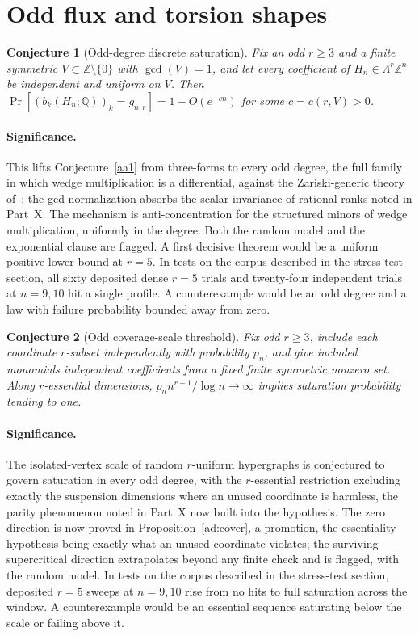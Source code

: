 \documentclass[11pt]{article}
\newtheorem{conjecture}{Conjecture}
\theoremstyle{definition}
\newcommand{\Z}{\mathbb Z}
\providecommand{\Z}{\mathbb Z}
\begin{document}
\section{Odd flux and torsion shapes}

\begin{conjecture}[Odd-degree discrete saturation]\label{ad1}
Fix an odd $r\ge3$ and a finite symmetric $V\subset\Z\setminus\{0\}$ with $\gcd(V)=1$, and let every coefficient of $H_n\in\Lambda^r\Z^n$ be independent and uniform on $V$.  Then $\Pr[(b_k(H_n;\mathbb Q))_k=g_{n,r}]=1-O(e^{-cn})$ for some $c=c(r,V)>0$.
\end{conjecture}

\paragraph{Significance.}
This lifts Conjecture~\ref{aa1} from three-forms to every odd degree, the full family in which wedge multiplication is a differential, against the Zariski-generic theory of~\cite{LN19}; the gcd normalization absorbs the scalar-invariance of rational ranks noted in Part~X.  The mechanism is anti-concentration for the structured minors of wedge multiplication, uniformly in the degree.  Both the random model and the exponential clause are flagged.  A first decisive theorem would be a uniform positive lower bound at $r=5$.  In tests on the corpus described in the stress-test section, all sixty deposited dense $r=5$ trials and twenty-four independent trials at $n=9,10$ hit a single profile.  A counterexample would be an odd degree and a law with failure probability bounded away from zero.

\begin{conjecture}[Odd coverage-scale threshold]\label{ad2}
Fix odd $r\ge3$, include each coordinate $r$-subset independently with probability $p_n$, and give included monomials independent coefficients from a fixed finite symmetric nonzero set.  Along $r$-essential dimensions, $p_nn^{r-1}/\log n\to\infty$ implies saturation probability tending to one.
\end{conjecture}

\paragraph{Significance.}
The isolated-vertex scale of random $r$-uniform hypergraphs is conjectured to govern saturation in every odd degree, with the $r$-essential restriction excluding exactly the suspension dimensions where an unused coordinate is harmless, the parity phenomenon noted in Part~X now built into the hypothesis.  The zero direction is now proved in Proposition~\ref{ad:cover}, a promotion, the essentiality hypothesis being exactly what an unused coordinate violates; the surviving supercritical direction extrapolates beyond any finite check and is flagged, with the random model.  In tests on the corpus described in the stress-test section, deposited $r=5$ sweeps at $n=9,10$ rise from no hits to full saturation across the window.  A counterexample would be an essential sequence saturating below the scale or failing above it.
\end{document}

